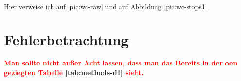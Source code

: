 \\
\par
Hier verweise ich auf \ref{pic:wc-raw} und auf Abbildung \ref{pic:wc-stops1}\\
\par
{}


\pagebreak
\section{Fehlerbetrachtung}
\label{sec:fehler}

\par
\textcolor{red}{\textbf{Man sollte nicht außer Acht lassen, dass man das Bereits in der oen geziegten Tabelle \ref{tab:methods-d1} sieht.}}


